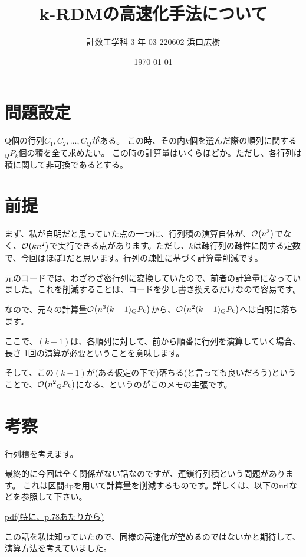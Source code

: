 \documentclass[a4paper, 10pt, dvipdfmx]{jlreq}
\begin{document}
\title{k-RDMの高速化手法について}
\author{計数工学科 3 年 03-220602 浜口広樹}
\date{\today}
\maketitle

\section{問題設定}

Q個の行列$C_1,C_2,...,C_Q$がある。
この時、その内$k$個を選んだ際の順列に関する${}_Q P_k$個の積を全て求めたい。
この時の計算量はいくらほどか。ただし、各行列は積に関して非可換であるとする。

\section{前提}

まず、私が自明だと思っていた点の一つに、行列積の演算自体が、$\order{n^3}$でなく、$\order{kn^2}$で実行できる点があります。ただし、$k$は疎行列の疎性に関する定数で、今回はほぼ1だと思います。行列の疎性に基づく計算量削減です。

元のコードでは、わざわざ密行列に変換していたので、前者の計算量になっていました。これを削減することは、コードを少し書き換えるだけなので容易です。

なので、元々の計算量$\order{n^3 (k-1) {}_Q P_k}$から、$\order{n^2 (k-1) {}_Q P_k}$へは自明に落ちます。

ここで、$(k-1)$は、各順列に対して、前から順番に行列を演算していく場合、長さ-1回の演算が必要ということを意味します。

そして、この$(k-1)$が(ある仮定の下で)落ちる(と言っても良いだろう)ということで、$\order{n^2 {}_Q P_k}$になる、というのがこのメモの主張です。

\section{考察}

行列積を考えます。

最終的に今回は全く関係がない話なのですが、連鎖行列積という問題があります。
これは区間dpを用いて計算量を削減するものです。詳しくは、以下のurlなどを参照して下さい。

\href{https://hcpc-hokudai.github.io/archive/dynamic_programming_002.pdf}{pdf(特に、p.78あたりから)}

この話を私は知っていたので、同様の高速化が望めるのではないかと期待して、演算方法を考えていました。
\end{document}

